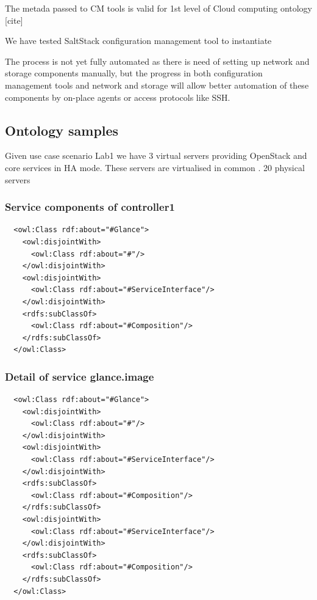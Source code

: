 The metada passed to CM tools is valid for 1st level of Cloud computing ontology [cite] 

%

We have tested SaltStack configuration management tool to instantiate 

The process is not yet fully automated as there is need of setting up network and storage components manually, but the progress in both configuration management tools and network and storage will allow better automation of these components by on-place agents or access protocols like SSH.

\subsection{Ontology samples}

Given use case scenario Lab1 we have 3 virtual servers providing OpenStack and core services in HA mode. These servers are virtualised in common . 20 physical servers  

\subsubsection{Service components of controller1}

\begin{lstlisting}
  <owl:Class rdf:about="#Glance">
    <owl:disjointWith>
      <owl:Class rdf:about="#"/>
    </owl:disjointWith>
    <owl:disjointWith>
      <owl:Class rdf:about="#ServiceInterface"/>
    </owl:disjointWith>
    <rdfs:subClassOf>
      <owl:Class rdf:about="#Composition"/>
    </rdfs:subClassOf>
  </owl:Class>
\end{lstlisting}

\subsubsection{Detail of service glance.image}

\begin{lstlisting}
  <owl:Class rdf:about="#Glance">
    <owl:disjointWith>
      <owl:Class rdf:about="#"/>
    </owl:disjointWith>
    <owl:disjointWith>
      <owl:Class rdf:about="#ServiceInterface"/>
    </owl:disjointWith>
    <rdfs:subClassOf>
      <owl:Class rdf:about="#Composition"/>
    </rdfs:subClassOf>
    <owl:disjointWith>
      <owl:Class rdf:about="#ServiceInterface"/>
    </owl:disjointWith>
    <rdfs:subClassOf>
      <owl:Class rdf:about="#Composition"/>
    </rdfs:subClassOf>
  </owl:Class>
\end{lstlisting}

